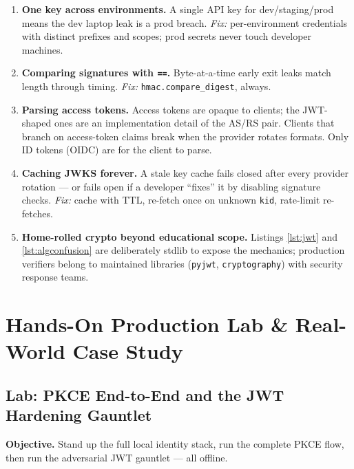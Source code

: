 \begin{enumerate}
        circuit-breaker semantics belong here as much as they do in service
        meshes~\cite{nygard2018releaseit}.
  \item \textbf{One key across environments.} A single API key for
        dev/staging/prod means the dev laptop leak is a prod breach.
        \emph{Fix:} per-environment credentials with distinct prefixes and
        scopes; prod secrets never touch developer machines.
  \item \textbf{Comparing signatures with \texttt{==}.} Byte-at-a-time
        early exit leaks match length through timing. \emph{Fix:}
        \texttt{hmac.compare\_digest}, always.
  \item \textbf{Parsing access tokens.} Access tokens are opaque to clients;
        the JWT-shaped ones are an implementation detail of the AS/RS
        pair. Clients that branch on access-token claims break when the
        provider rotates formats. Only ID tokens (OIDC) are for the client
        to parse.
  \item \textbf{Caching JWKS forever.} A stale key cache fails closed after
        every provider rotation --- or fails open if a developer ``fixes''
        it by disabling signature checks. \emph{Fix:} cache with TTL,
        re-fetch once on unknown \texttt{kid}, rate-limit re-fetches.
  \item \textbf{Home-rolled crypto beyond educational scope.} Listings
        \ref{lst:jwt} and \ref{lst:algconfusion} are deliberately stdlib to
        expose the mechanics; production verifiers belong to maintained
        libraries (\texttt{pyjwt}, \texttt{cryptography}) with security
        response teams.
\end{enumerate}

\section{Hands-On Production Lab \& Real-World Case Study}
\label{sec:ch5-lab}

\subsection{Lab: PKCE End-to-End and the JWT Hardening Gauntlet}

\textbf{Objective.} Stand up the full local identity stack, run the complete
PKCE flow, then run the adversarial JWT gauntlet --- all offline.

